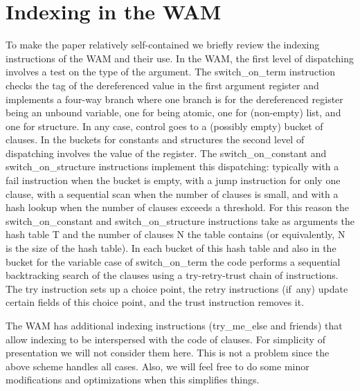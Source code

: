 \documentclass{llncs}
\newcommand{\instr}[1]{\textsf{#1}}
\newcommand{\try}{\instr{try}\xspace}
\newcommand{\retry}{\mbox{\instr{retry}}\xspace}
\newcommand{\trust}{\instr{trust}\xspace}
\newcommand{\TryRetryTrust}{\mbox{\instr{try-retry-trust}}\xspace}
\newcommand{\fail}{\instr{fail}\xspace}
\newcommand{\jump}{\instr{jump}\xspace}
\newcommand{\switchONterm}{\mbox{\instr{switch\_on\_term}}\xspace}
\newcommand{\switchONconstant}{\mbox{\instr{switch\_on\_constant}}\xspace}
\newcommand{\switchONstructure}{\mbox{\instr{switch\_on\_structure}}\xspace}
\begin{document}
\section{Indexing in the WAM} \label{sec:prelims}
To make the paper relatively self-contained we briefly review the
indexing instructions of the WAM and their use. In the WAM, the first
level of dispatching involves a test on the type of the argument. The
\switchONterm instruction checks the tag of the dereferenced value in
the first argument register and implements a four-way branch where one
branch is for the dereferenced register being an unbound variable, one
for being atomic, one for (non-empty) list, and one for structure. In
any case, control goes to a (possibly empty) bucket of clauses. In the
buckets for constants and structures the second level of dispatching
involves the value of the register. The \switchONconstant and
\switchONstructure instructions implement this dispatching: typically
with a \fail instruction when the bucket is empty, with a \jump
instruction for only one clause, with a sequential scan when the
number of clauses is small, and with a hash lookup when the number of
clauses exceeds a threshold. For this reason the \switchONconstant and
\switchONstructure instructions take as arguments the hash table
\instr{T} and the number of clauses \instr{N} the table contains (or
equivalently, \instr{N} is the size of the hash table). In each bucket
of this hash table and also in the bucket for the variable case of
\switchONterm the code performs a sequential backtracking search of
the clauses using a \TryRetryTrust chain of instructions. The \try
instruction sets up a choice point, the \retry instructions (if~any)
update certain fields of this choice point, and the \trust instruction
removes it.

The WAM has additional indexing instructions (\instr{try\_me\_else}
and friends) that allow indexing to be interspersed with the code of
clauses. For simplicity of presentation we will not consider them
here. This is not a problem since the above scheme handles all cases.
Also, we will feel free to do some minor modifications and
optimizations when this simplifies things.
\end{document}
